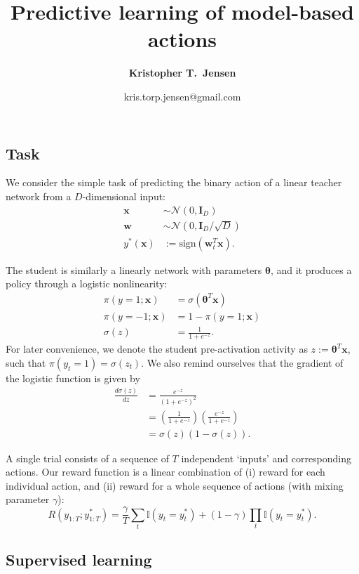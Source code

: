 \documentclass{article}
\title{Predictive learning of model-based actions}
\author[1]{\normalsize \bfseries Kristopher T.\ Jensen}
\affil[1]{ \small Sainsbury Wellcome Centre, University College London, London, UK}
\date{\vspace*{-1.5em}
\normalsize kris.torp.jensen@gmail.com
}
\renewcommand\b\bm
\renewcommand\b\bm
\begin{document}
\maketitle

\subsection*{Task}

We consider the simple task of predicting the binary action of a linear teacher network from a $D$-dimensional input:
\begin{align}
    \b{x} &\sim \mathcal{N}(0, \b{I}_D)\\
    \b{w} &\sim \mathcal{N}(0, \b{I}_D / \sqrt{D})\\
    y^*(\b{x}) &:= \text{sign}(\b{w}_t^T \b{x}).
\end{align}

The student is similarly a linearly network with parameters $\b{\theta}$, and it produces a policy through a logistic nonlinearity:
\begin{align}
    \pi(y = 1; \b{x}) &= \sigma(\b{\theta}^T \b{x})\\
    \pi(y=-1; \b{x}) &= 1-\pi(y = 1; \b{x})\\
    \sigma(z) &= \frac{1}{1 + e^{-z}}.
\end{align}
For later convenience, we denote the student pre-activation activity as $z := \b{\theta}^T \b{x}$, such that $\pi(y_t = 1) = \sigma(z_t)$.
We also remind ourselves that the gradient of the logistic function is given by
\begin{align}
    \frac{d \sigma (z)}{dz} &= \frac{e^{-z}}{(1 + e^{-z})^2}\\
    &= \left ( \frac{1}{1 + e^{-z}} \right ) \left ( \frac{e^{-z}}{1 + e^{-z}} \right ) \\
    &= \sigma(z) (1 - \sigma(z)).
\end{align}

A single trial consists of a sequence of $T$ independent `inputs' and corresponding actions.
Our reward function is a linear combination of (i) reward for each individual action, and (ii) reward for a whole sequence of actions (with mixing parameter $\gamma$):
\begin{equation}
    R(y_{1:T} ; y^*_{1:T}) = \frac{\gamma}{T} \sum_t \mathbb{I}(y_t = y^*_t) + (1-\gamma) \prod_t \mathbb{I}(y_t = y^*_t).
\end{equation}

\subsection*{Supervised learning}
\end{document}
